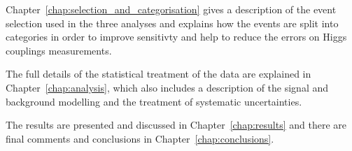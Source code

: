 Chapter~\ref{chap:selection_and_categorisation} gives a description of the event selection used in the three analyses and explains how the events are split into categories in order to improve sensitivty and help to reduce the errors on Higgs couplings measurements.

The full details of the statistical treatment of the data are explained in Chapter~\ref{chap:analysis}, which also includes a description of the signal and background modelling and the treatment of systematic uncertainties.

The results are presented and discussed in Chapter~\ref{chap:results} and there are final comments and conclusions in Chapter~\ref{chap:conclusions}.

